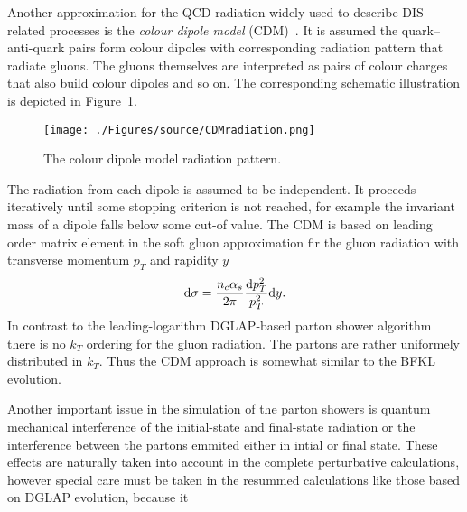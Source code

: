 Another approximation for the QCD radiation widely used to describe DIS related processes is the \emph{colour dipole model} (CDM)~\cite{cdm}. It is assumed the quark--anti-quark pairs form colour dipoles with corresponding radiation pattern that radiate gluons. The gluons themselves are interpreted as pairs of colour charges that also build colour dipoles and so on. The corresponding schematic illustration is depicted in Figure~\ref{fig:cdm}. 
\begin{figure}[t]%
\texttt{[image: ./Figures/source/CDMradiation.png]}%
\caption{The colour dipole model radiation pattern.}%
\label{fig:cdm}%
\end{figure}
The radiation from each dipole is assumed to be independent. It proceeds iteratively until some stopping criterion is not reached, for example the invariant mass of a dipole falls below some cut-of  value. The CDM is based on leading order matrix element in the soft gluon approximation fir the gluon radiation with transverse momentum $p_T$ and rapidity $y$
\begin{equation}
\mathrm{d}\sigma = \frac{n_c\mbox{$\alpha_{s}$}}{2\pi}\frac{\mathrm{d}p_T^2}{p_T^2}\mathrm{d}y.
\end{equation}
In contrast to the leading-logarithm DGLAP-based parton shower algorithm there is no $k_T$ ordering for the gluon radiation. The partons are rather uniformely distributed in $k_T$. Thus the CDM approach is somewhat similar to the BFKL evolution.

Another important issue in the simulation of the parton showers is quantum mechanical interference of the initial-state and final-state radiation or the interference between the partons emmited either in intial or final state. These effects are naturally taken into account in the complete perturbative calculations, however special care must be taken in the resummed calculations like those based on DGLAP evolution, because it 

